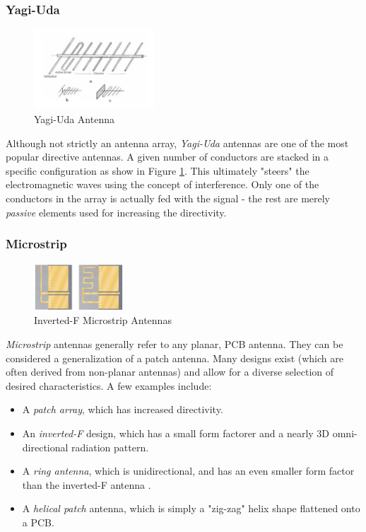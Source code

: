 \subsubsection{Yagi-Uda}
\begin{figure}[!htb]
  \centering
  \includegraphics[width=0.4\textwidth]{yagi}
  \caption{Yagi-Uda Antenna \cite{site-icantennasYagi}}
  \label{fig:yagi}
\end{figure}
Although not strictly an antenna array, \textit{Yagi-Uda} antennas are one of the most popular directive antennas. A given number of conductors are stacked in a specific configuration as show in  Figure \ref{fig:yagi}. This ultimately "steers" the electromagnetic waves using the concept of interference. Only one of the conductors in the array is actually fed with the signal - the rest are merely \textit{passive} elements used for increasing the directivity.

\subsubsection{Microstrip}
\begin{figure}[!htb]
  \centering
  \includegraphics[width=0.3\textwidth]{invertedF}
  \caption{Inverted-F Microstrip Antennas \cite{site-invertedFAntenna}}
  \label{fig:invertedF}
\end{figure}
\textit{Microstrip} antennas generally refer to any planar, PCB antenna. They can be considered a generalization of a patch antenna. Many designs exist (which are often derived from non-planar antennas) and allow for a diverse selection of desired characteristics. A few examples include:
\begin{itemize}
  \item A \textit{patch array}, which has increased directivity.
  \item An \textit{inverted-F} design, which has a small form factorer and a nearly 3D omni-directional radiation pattern.
  \item A \textit{ring antenna}, which is unidirectional, and has an even smaller form factor than the inverted-F antenna \cite{paper-lowProfileRingAntenna}.
  \item A \textit{helical patch} antenna, which is simply a "zig-zag" helix shape flattened onto a PCB.
\end{itemize}


